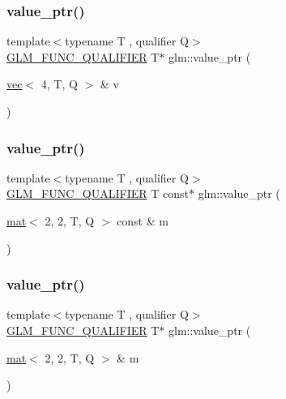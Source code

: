\subsubsection{\texorpdfstring{value\+\_\+ptr()}{value\_ptr()}\hspace{0.1cm}{\footnotesize\ttfamily [6/27]}}
{\footnotesize\ttfamily template$<$typename T , qualifier Q$>$ \\
\mbox{\hyperlink{setup_8hpp_a33fdea6f91c5f834105f7415e2a64407}{G\+L\+M\+\_\+\+F\+U\+N\+C\+\_\+\+Q\+U\+A\+L\+I\+F\+I\+ER}} T$\ast$ glm\+::value\+\_\+ptr (\begin{DoxyParamCaption}\item[{\mbox{\hyperlink{structglm_1_1vec}{vec}}$<$ 4, T, Q $>$ \&}]{v }\end{DoxyParamCaption})}

\mbox{\label{group__gtc__type__ptr_ga6144a4839923074f038b63506b855faf}} 
\subsubsection{\texorpdfstring{value\+\_\+ptr()}{value\_ptr()}\hspace{0.1cm}{\footnotesize\ttfamily [7/27]}}
{\footnotesize\ttfamily template$<$typename T , qualifier Q$>$ \\
\mbox{\hyperlink{setup_8hpp_a33fdea6f91c5f834105f7415e2a64407}{G\+L\+M\+\_\+\+F\+U\+N\+C\+\_\+\+Q\+U\+A\+L\+I\+F\+I\+ER}} T const$\ast$ glm\+::value\+\_\+ptr (\begin{DoxyParamCaption}\item[{\mbox{\hyperlink{structglm_1_1mat}{mat}}$<$ 2, 2, T, Q $>$ const \&}]{m }\end{DoxyParamCaption})}

\mbox{\label{group__gtc__type__ptr_gac636dcc35b194f5e950a3d0fb9ef44ef}} 
\subsubsection{\texorpdfstring{value\+\_\+ptr()}{value\_ptr()}\hspace{0.1cm}{\footnotesize\ttfamily [8/27]}}
{\footnotesize\ttfamily template$<$typename T , qualifier Q$>$ \\
\mbox{\hyperlink{setup_8hpp_a33fdea6f91c5f834105f7415e2a64407}{G\+L\+M\+\_\+\+F\+U\+N\+C\+\_\+\+Q\+U\+A\+L\+I\+F\+I\+ER}} T$\ast$ glm\+::value\+\_\+ptr (\begin{DoxyParamCaption}\item[{\mbox{\hyperlink{structglm_1_1mat}{mat}}$<$ 2, 2, T, Q $>$ \&}]{m }\end{DoxyParamCaption})}

